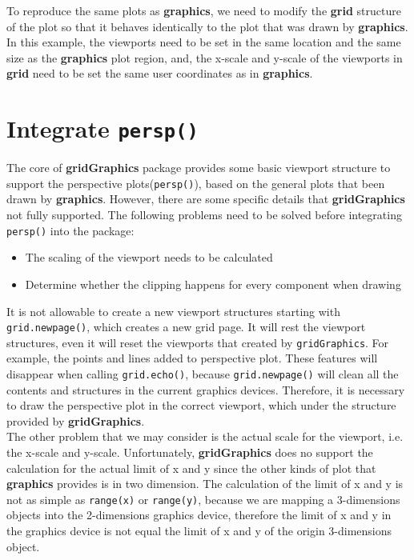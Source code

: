 \documentclass[11pt]{report}
\begin{document}
To reproduce the same plots as \textbf{graphics}, we need to modify the \textbf{grid} structure of the plot so that it behaves identically to the plot that was drawn by \textbf{graphics}. In this example, the viewports need to be set in the same location and the same size as the \textbf{graphics} plot region, and, the x-scale and y-scale of the viewports in \textbf{grid} need to be set the same user coordinates as in \textbf{graphics}.\\

\section{Integrate \texttt{persp()}}
The core of \textbf{gridGraphics} package provides some basic viewport structure to support the perspective plots(\texttt{persp()}), based on the general plots that been drawn by \textbf{graphics}. However, there are some specific details that \textbf{gridGraphics} not fully supported.
The following problems need to be solved before integrating \texttt{persp()} into the package:
\begin{itemize}
	\item{The scaling of the viewport needs to be calculated}
	\item{Determine whether the clipping happens for every component when drawing}
\end{itemize}

It is not allowable to create a new viewport structures starting with \texttt{grid.newpage()}, which creates a new grid page. It will rest the viewport structures, even it will reset the viewports that created by \texttt{gridGraphics}.
For example, the points and lines added to perspective plot. These features will disappear when calling \texttt{grid.echo()}, because \texttt{grid.newpage()} will clean all the contents and structures in the current graphics devices. Therefore, it is necessary to draw the perspective plot in the correct viewport, which under the structure provided by \textbf{gridGraphics}.\\

The other problem that we may consider is the actual scale for the viewport, i.e. the x-scale and y-scale. Unfortunately, \textbf{gridGraphics} does no support the calculation for the actual limit of x and y since the other kinds of plot that \textbf{graphics} provides is in two dimension. The calculation of the limit of x and y is not as simple as \texttt{range(x)} or \texttt{range(y)}, because we are mapping a 3-dimensions objects into the 2-dimensions graphics device, therefore the limit of x and y in the graphics device is not equal the limit of x and y of the origin 3-dimensions object.\\
\end{document}

